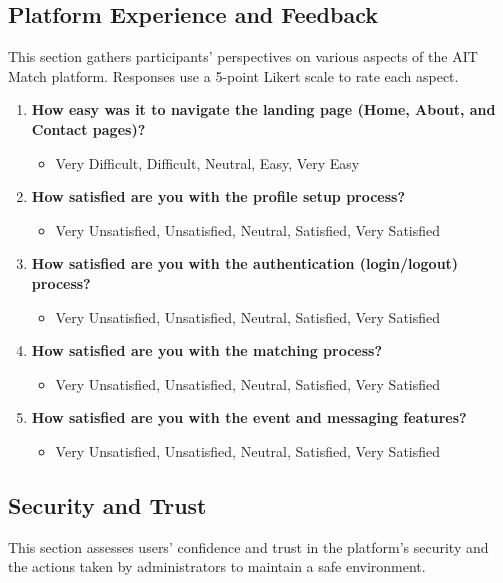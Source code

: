 \newpage
\subsection{Platform Experience and Feedback}

This section gathers participants’ perspectives on various aspects of the AIT Match platform. Responses use a 5-point Likert scale to rate each aspect.

\begin{enumerate}
\item \textbf{How easy was it to navigate the landing page (Home, About, and Contact pages)?}
\begin{itemize}
\item Very Difficult, Difficult, Neutral, Easy, Very Easy
\end{itemize}
\item \textbf{How satisfied are you with the profile setup process?}
\begin{itemize}
\item Very Unsatisfied, Unsatisfied, Neutral, Satisfied, Very Satisfied
\end{itemize}
\item \textbf{How satisfied are you with the authentication (login/logout) process?}
\begin{itemize}
\item Very Unsatisfied, Unsatisfied, Neutral, Satisfied, Very Satisfied
\end{itemize}
\item \textbf{How satisfied are you with the matching process?}
\begin{itemize}
\item Very Unsatisfied, Unsatisfied, Neutral, Satisfied, Very Satisfied
\end{itemize}
\item \textbf{How satisfied are you with the event and messaging features?}
\begin{itemize}
\item Very Unsatisfied, Unsatisfied, Neutral, Satisfied, Very Satisfied
\end{itemize}
\end{enumerate}


\subsection{Security and Trust}
This section assesses users’ confidence and trust in the platform’s security and the actions taken by administrators to maintain a safe environment.

